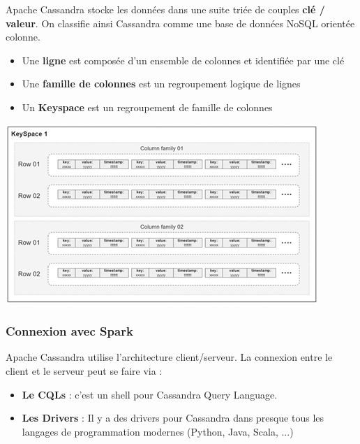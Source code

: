 \documentclass[a4paper, 11pt, titlepage]{article}
\begin{document}
\noindent Apache Cassandra stocke les données dans une suite triée de couples \textbf{clé / valeur}. On classifie ainsi Cassandra comme une base de données NoSQL orientée colonne.

\begin{itemize}

\item
Une \textbf{ligne} est composée d'un ensemble de colonnes et identifiée par une clé

\item
Une \textbf{famille de colonnes} est un regroupement logique de lignes

\item
Un \textbf{Keyspace} est un regroupement de famille de colonnes

\end{itemize}

\begin{center}
\includegraphics[scale=0.6]{res/model2_cass.png}
\end{center}


\subsubsection* {Connexion avec Spark}

Apache Cassandra utilise l'architecture client/serveur. La connexion entre le client et le serveur peut se faire via :

\begin{itemize}

\item
\textbf{Le CQLs} : c'est un shell pour Cassandra Query Language.

\item
\textbf{Les Drivers} : Il y a des drivers pour Cassandra dans presque tous les langages de programmation modernes (Python, Java, Scala, ...)

\end{itemize}
\end{document}
